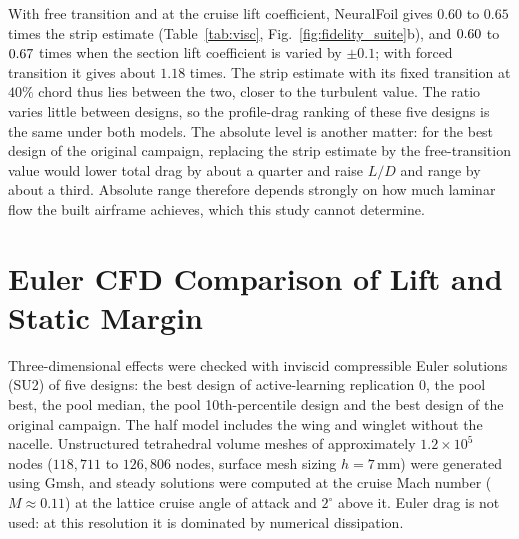 With free transition and at the cruise lift coefficient, NeuralFoil gives $0.60$ to $0.65$ times the strip estimate (Table~\ref{tab:visc}, Fig.~\ref{fig:fidelity_suite}b), and $0.60$ to $0.67$ times when the section lift coefficient is varied by $\pm 0.1$; with forced transition it gives about $1.18$ times. The strip estimate with its fixed transition at $40\%$ chord thus lies between the two, closer to the turbulent value. The ratio varies little between designs, so the profile-drag ranking of these five designs is the same under both models. The absolute level is another matter: for the best design of the original campaign, replacing the strip estimate by the free-transition value would lower total drag by about a quarter and raise $L/D$ and range by about a third. Absolute range therefore depends strongly on how much laminar flow the built airframe achieves, which this study cannot determine.



\section{Euler CFD Comparison of Lift and Static Margin}
\label{sec:cfd_validation}
Three-dimensional effects were checked with inviscid compressible Euler solutions (SU2) of five designs: the best design of active-learning replication 0, the pool best, the pool median, the pool 10th-percentile design and the best design of the original campaign. The half model includes the wing and winglet without the nacelle. Unstructured tetrahedral volume meshes of approximately $1.2 \times 10^5$ nodes ($118{,}711$ to $126{,}806$ nodes, surface mesh sizing $h = 7\,\mathrm{mm}$) were generated using Gmsh, and steady solutions were computed at the cruise Mach number ($M \approx 0.11$) at the lattice cruise angle of attack and $2^\circ$ above it. Euler drag is not used: at this resolution it is dominated by numerical dissipation.

\begin{table}[htbp]
\centering\small
\caption{Comparison of three-dimensional compressible Euler solutions (SU2) with the lattice predictions for five representative designs.}
\label{tab:cfd}
\resizebox{\linewidth}{!}{%

}
\end{table}


